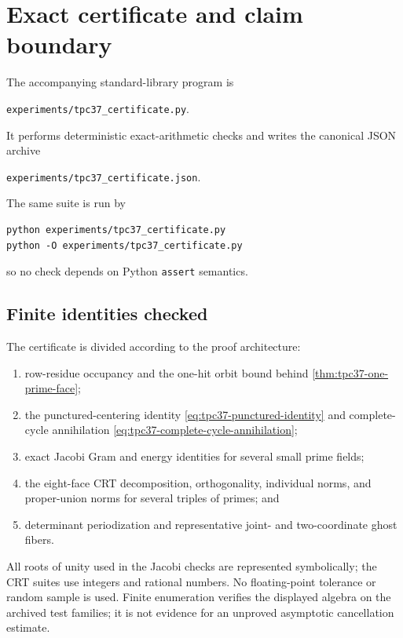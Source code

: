 \section{Exact certificate and claim boundary}
\label{sec:tpc37-certificate}

The accompanying standard-library program is
\begin{center}
\texttt{experiments/tpc37\_certificate.py}.
\end{center}
It performs deterministic exact-arithmetic checks and writes the canonical
JSON archive
\begin{center}
\texttt{experiments/tpc37\_certificate.json}.
\end{center}
The same suite is run by
\begin{verbatim}
python experiments/tpc37_certificate.py
python -O experiments/tpc37_certificate.py
\end{verbatim}
so no check depends on Python \texttt{assert} semantics.

\subsection{Finite identities checked}

The certificate is divided according to the proof architecture:
\begin{enumerate}[label=(\roman*)]
 \item row-residue occupancy and the one-hit orbit bound behind
 \cref{thm:tpc37-one-prime-face};
 \item the punctured-centering identity
 \eqref{eq:tpc37-punctured-identity} and complete-cycle annihilation
 \eqref{eq:tpc37-complete-cycle-annihilation};
 \item exact Jacobi Gram and energy identities for several small prime
 fields;
 \item the eight-face CRT decomposition, orthogonality, individual norms,
 and proper-union norms for several triples of primes; and
 \item determinant periodization and representative joint- and
 two-coordinate ghost fibers.
\end{enumerate}
All roots of unity used in the Jacobi checks are represented symbolically;
the CRT suites use integers and rational numbers.  No floating-point
tolerance or random sample is used.  Finite enumeration verifies the
displayed algebra on the archived test families; it is not evidence for an
unproved asymptotic cancellation estimate.

